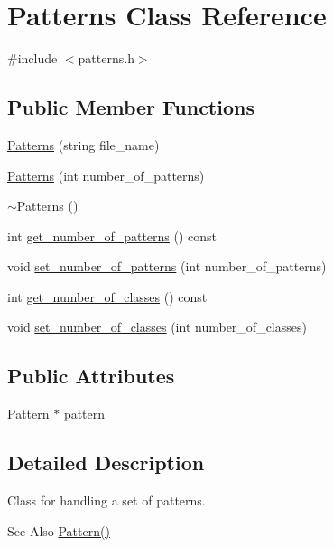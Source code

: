 \hypertarget{classPatterns}{\section{Patterns Class Reference}
\label{classPatterns}
}


{\ttfamily \#include $<$patterns.\+h$>$}

\subsection*{Public Member Functions}
\begin{DoxyCompactItemize}
\item 
\hyperlink{classPatterns_a91b41ddbe7a24c86697f5e19b93e0f75}{Patterns} (string file\+\_\+name)
\item 
\hyperlink{classPatterns_ab847348dfaab14ef8a5f9dbc1a936039}{Patterns} (int number\+\_\+of\+\_\+patterns)
\item 
\hyperlink{classPatterns_a91257ce4caca2a7ed65d931cdaeaeb6b}{$\sim$\+Patterns} ()
\item 
int \hyperlink{classPatterns_a76a42a6d7eca37020a3481c9d3ffa214}{get\+\_\+number\+\_\+of\+\_\+patterns} () const 
\item 
void \hyperlink{classPatterns_abbac70e6ecb3c8677e5418ed85170fe6}{set\+\_\+number\+\_\+of\+\_\+patterns} (int number\+\_\+of\+\_\+patterns)
\item 
int \hyperlink{classPatterns_aea4f00f4ee4d22876ac8f6850098c3e1}{get\+\_\+number\+\_\+of\+\_\+classes} () const 
\item 
void \hyperlink{classPatterns_adcfd5d41467f7174f12c139adcbea384}{set\+\_\+number\+\_\+of\+\_\+classes} (int number\+\_\+of\+\_\+classes)
\end{DoxyCompactItemize}
\subsection*{Public Attributes}
\begin{DoxyCompactItemize}
\item 
\hyperlink{classPattern}{Pattern} $\ast$ \hyperlink{classPatterns_ab5b283a2773d6c1cba88ec55240c5902}{pattern}
\end{DoxyCompactItemize}


\subsection{Detailed Description}
Class for handling a set of patterns. \begin{DoxySeeAlso}{See Also}
\hyperlink{classPattern}{Pattern()} 
\end{DoxySeeAlso}


